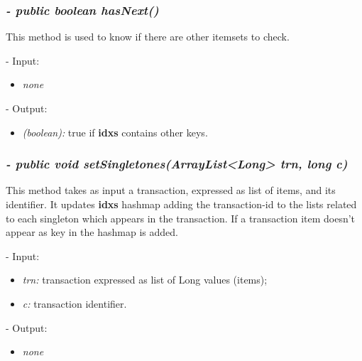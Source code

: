\documentclass[]{report}
\begin{document}
	\subsubsection*{\textit{\textbf{-} public boolean hasNext()}}   	
	This method is used to know if there are other itemsets to check.   
	\begin{description}
		\item - Input:
		\begin{itemize}
			\item \textit{none}
		\end{itemize}
	\end{description}	
	\begin{description}
		\item - Output:
		\begin{itemize}
			\item \textit{(boolean):} true if \textbf{idxs} contains other keys. 
		\end{itemize}
	\end{description}
	
	\subsubsection*{\textit{\textbf{-} public void setSingletones(ArrayList<Long> trn, long c)}}   	
	This method takes as input a transaction, expressed as list of items, and its identifier. It updates \textbf{idxs} hashmap adding the transaction-id to the lists related to each singleton which appears in the transaction. If a transaction item doesn't appear as key in the hashmap is added.    
	\begin{description}
		\item - Input:
		\begin{itemize}
			\item \textit{trn:} transaction expressed as list of Long values (items);
			\item \textit{c:} transaction identifier.
		\end{itemize}
	\end{description}	
	\begin{description}
		\item - Output:
		\begin{itemize}
			\item \textit{none} 
		\end{itemize}
	\end{description}
	
\end{document}
